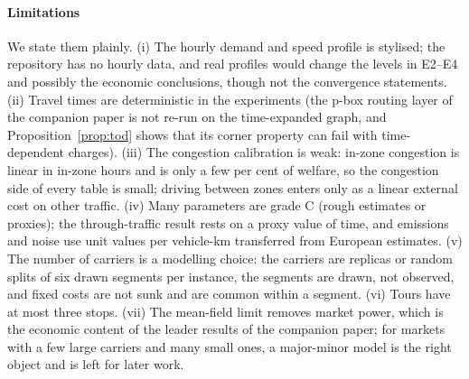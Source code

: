 \documentclass[preprint,11pt,authoryear]{elsarticle}
\theoremstyle{plain}
\theoremstyle{remark}
\begin{document}
\paragraph{Limitations} We state them plainly. (i) The hourly demand and speed profile is stylised; the repository has no hourly data, and real profiles would change the levels in E2--E4 and possibly the economic conclusions, though not the convergence statements. (ii) Travel times are deterministic in the experiments (the p-box routing layer of the companion paper is not re-run on the time-expanded graph, and Proposition~\ref{prop:tod} shows that its corner property can fail with time-dependent charges). (iii) The congestion calibration is weak: in-zone congestion is linear in in-zone hours and is only a few per cent of welfare, so the congestion side of every table is small; driving between zones enters only as a linear external cost on other traffic. (iv) Many parameters are grade C (rough estimates or proxies); the through-traffic result rests on a proxy value of time, and emissions and noise use unit values per vehicle-km transferred from European estimates. (v) The number of carriers is a modelling choice: the carriers are replicas or random splits of six drawn segments per instance, the segments are drawn, not observed, and fixed costs are not sunk and are common within a segment. (vi) Tours have at most three stops. (vii) The mean-field limit removes market power, which is the economic content of the leader results of the companion paper; for markets with a few large carriers and many small ones, a major-minor model is the right object and is left for later work.
\end{document}
